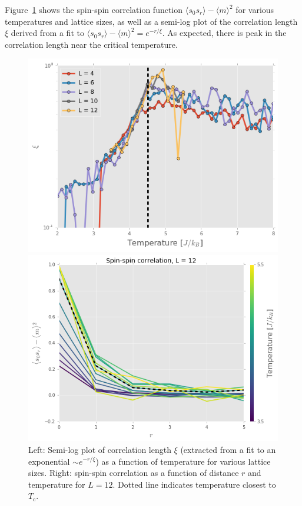 \documentclass[11pt, oneside]{article}
\begin{document}
Figure~\ref{fig:3D_corr} shows the spin-spin correlation function $\langle{s_0s_r}\rangle-\langle{m}\rangle^2$ for various temperatures and lattice sizes, as well as a semi-log plot of the correlation length $\xi$ derived from a fit to $\langle{s_0s_r}\rangle-\langle{m}\rangle^2=e^{-r/\xi}$. As expected, there is peak in the correlation length near the critical temperature.
\begin{figure}[H]
\begin{minipage}{0.47\textwidth}
    \includegraphics[width=\linewidth]{img/3D/xi_T}
    \end{minipage}
    \hspace{\fill} %
    \begin{minipage}{0.47\textwidth}
    \includegraphics[width=\linewidth]{img/3D/spinspin12}
    \end{minipage}
\caption{Left: Semi-log plot of correlation length $\xi$ (extracted from a fit to an exponential $\sim e^{-r/\xi}$) as a function of temperature for various lattice sizes. Right: spin-spin correlation as a function of distance $r$ and temperature for $L=12$. Dotted line indicates temperature closest to $T_\text{c}$.}
\label{fig:3D_corr}
\end{figure}
\end{document}
